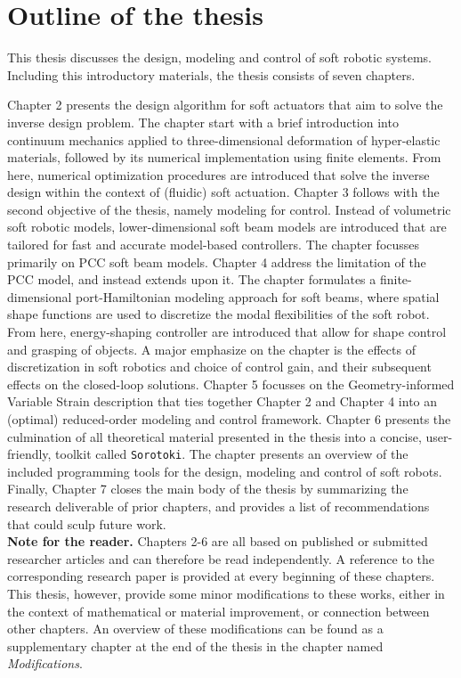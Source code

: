 \section{Outline of the thesis}
\label{sec:intro:outline}
This thesis discusses the design, modeling and control of soft robotic systems. Including this introductory materials, the thesis consists of seven chapters. 

Chapter 2 presents the design algorithm for soft actuators that aim to solve the inverse design problem. The chapter start with a brief introduction into continuum mechanics applied to three-dimensional deformation of hyper-elastic materials, followed by its numerical implementation using finite elements. From here, numerical optimization procedures are introduced that solve the inverse design within the context of (fluidic) soft actuation. Chapter 3 follows with the second objective of the thesis, namely modeling for control. Instead of volumetric soft robotic models, lower-dimensional soft beam models are introduced that are tailored for fast and accurate model-based controllers. The chapter focusses primarily on PCC soft beam models. Chapter 4 address the limitation of the PCC model, and instead extends upon it. The chapter formulates a finite-dimensional port-Hamiltonian modeling approach for soft beams, where spatial shape functions are used to discretize the modal flexibilities of the soft robot. From here, energy-shaping controller are introduced that allow for shape control and grasping of objects. A major emphasize on the chapter is the effects of discretization in soft robotics and choice of control gain, and their subsequent effects on the closed-loop solutions. Chapter 5 focusses on the Geometry-informed Variable Strain description that ties together Chapter 2 and Chapter 4 into an (optimal) reduced-order modeling and control framework. Chapter 6 presents the culmination of all theoretical material presented in the thesis into a concise, user-friendly, toolkit called \texttt{Sorotoki}. The chapter presents an overview of the included programming tools for the design, modeling and control of soft robots. Finally, Chapter 7 closes the main body of the thesis by summarizing the research deliverable of prior chapters, and provides a list of recommendations that could sculp future work.\\[0.1em]

\textbf{Note for the reader.} Chapters 2-6 are all based on published or submitted researcher articles and can therefore be read independently. A reference to the corresponding research paper is provided at every beginning of these chapters. This thesis, however, provide some minor modifications to these works, either in the context of mathematical or material improvement, or connection between other chapters. An overview of these modifications can be found as a supplementary chapter at the end of the thesis in the chapter named \textit{Modifications}. 

